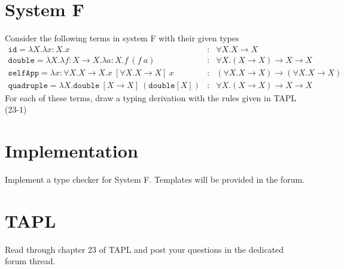 \section{System F}
Consider the following terms in system F with their given types
\[
\begin{array}{lcr}
\mathtt{id} =\lambda X.\lambda x:X.x &:& \forall X.X\rightarrow X\\
\mathtt{double} = \lambda X.\lambda f:X\rightarrow X.\lambda a:X. f\ (f\ a) &:& \forall X.(X\rightarrow X)\rightarrow X\rightarrow X\\
\mathtt{selfApp} = \lambda x:\forall X.X\rightarrow X. x\ [\forall X.X\rightarrow X]\ x &:& (\forall X.X\rightarrow X) \rightarrow (\forall X.X\rightarrow X)\\
\mathtt{quadruple} = \lambda X.\mathtt{double}\ [X\rightarrow X]\ (\mathtt{double} [X]) &:&\forall X.(X\rightarrow X)\rightarrow X\rightarrow X
\end{array}
\]
For each of these terms, draw a typing derivation with the rules given in TAPL (23-1)

\section{Implementation}
Implement a type checker for System F.
Templates will be provided in the forum.

\section{TAPL}
Read through chapter 23 of TAPL and post your questions in the dedicated forum thread.
